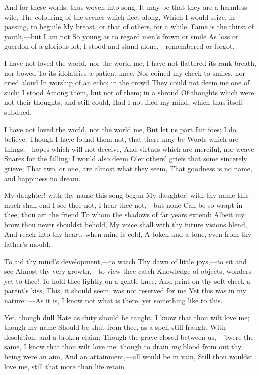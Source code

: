 \documentclass[10pt,twocolumn]{book}
\begin{document}
   And for these words, thus woven into song,
   It may be that they are a harmless wile,\textemdash
   The colouring of the scenes which fleet along,
   Which I would seize, in passing, to beguile
   My breast, or that of others, for a while.
   Fame is the thirst of youth,---but I am not
   So young as to regard men's frown or smile
   As loss or guerdon of a glorious lot;
I stood and stand alone,---remembered or forgot.


   I have not loved the world, nor the world me;
   I have not flattered its rank breath, nor bowed
   To its idolatries a patient knee,\textemdash
   Nor coined my cheek to smiles, nor cried aloud
   In worship of an echo; in the crowd
   They could not deem me one of such; I stood
   Among them, but not of them; in a shroud
   Of thoughts which were not their thoughts, and still could,
Had I not filed my mind, which thus itself subdued.


   I have not loved the world, nor the world me,\textemdash
   But let us part fair foes; I do believe,
   Though I have found them not, that there may be
   Words which are things,---hopes which will not deceive,
   And virtues which are merciful, nor weave
   Snares for the falling:  I would also deem
   O'er others' griefs that some sincerely grieve;
   That two, or one, are almost what they seem,\textemdash
That goodness is no name, and happiness no dream.


   My daughter! with thy name this song begun\textemdash
   My daughter! with thy name this much shall end\textemdash
   I see thee not, I hear thee not,---but none
   Can be so wrapt in thee; thou art the friend
   To whom the shadows of far years extend:
   Albeit my brow thou never shouldst behold,
   My voice shall with thy future visions blend,
   And reach into thy heart, when mine is cold,\textemdash
A token and a tone, even from thy father's mould.


   To aid thy mind's development,---to watch
   Thy dawn of little joys,---to sit and see
   Almost thy very growth,---to view thee catch
   Knowledge of objects, wonders yet to thee!
   To hold thee lightly on a gentle knee,
   And print on thy soft cheek a parent's kiss,\textemdash
   This, it should seem, was not reserved for me
   Yet this was in my nature: ---As it is,
I know not what is there, yet something like to this.


   Yet, though dull Hate as duty should be taught,
   I know that thou wilt love me; though my name
   Should be shut from thee, as a spell still fraught
   With desolation, and a broken claim:
   Though the grave closed between us,---'twere the same,
   I know that thou wilt love me:  though to drain
   \textit{my} blood from out thy being were an aim,
   And an attainment,---all would be in vain,\textemdash
Still thou wouldst love me, still that more than life retain.
\end{document}
